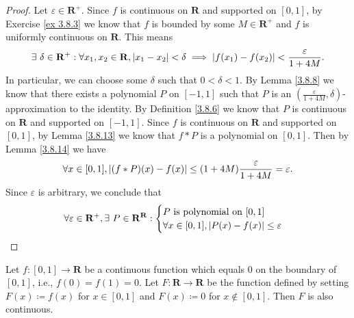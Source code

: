 \begin{proof}
    Let \(\varepsilon \in \mathbf{R}^+\).
    Since \(f\) is continuous on \(\mathbf{R}\) and supported on \([0, 1]\), by Exercise \ref{ex 3.8.3} we know that \(f\) is bounded by some \(M \in \mathbf{R}^+\) and \(f\) is uniformly continuous on \(\mathbf{R}\).
    This means
    \[
        \exists\ \delta \in \mathbf{R}^+ : \forall x_1, x_2 \in \mathbf{R}, \abs*{x_1 - x_2} < \delta \implies \abs*{f(x_1) - f(x_2)} < \frac{\varepsilon}{1 + 4M}.
    \]
    In particular, we can choose some \(\delta\) such that \(0 < \delta < 1\).
    By Lemma \ref{3.8.8} we know that there exists a polynomial \(P\) on \([-1, 1]\) such that \(P\) is an \((\frac{\varepsilon}{1 + 4M}, \delta)\)-approximation to the identity.
    By Definition \ref{3.8.6} we know that \(P\) is continuous on \(\mathbf{R}\) and supported on \([-1, 1]\).
    Since \(f\) is continuous on \(\mathbf{R}\) and supported on \([0, 1]\), by Lemma \ref{3.8.13} we know that \(f * P\) is a polynomial on \([0, 1]\).
    Then by Lemma \ref{3.8.14} we have
    \[
        \forall x \in [0, 1], \abs*{(f * P)(x) - f(x)} \leq (1 + 4M) \frac{\varepsilon}{1 + 4M} = \varepsilon.
    \]
    Since \(\varepsilon\) is arbitrary, we conclude that
    \[
        \forall \varepsilon \in \mathbf{R}^+, \exists\ P \in \mathbf{R}^{\mathbf{R}} : \begin{cases}
            P \text{ is polynomial on } [0, 1] \\
            \forall x \in [0, 1], \abs*{P(x) - f(x)} \leq \varepsilon
        \end{cases}
    \]
\end{proof}

\begin{lemma}\label{3.8.16}
    Let \(f : [0, 1] \to \mathbf{R}\) be a continuous function which equals \(0\) on the boundary of \([0, 1]\), i.e., \(f(0) = f(1) = 0\).
    Let \(F : \mathbf{R} \to \mathbf{R}\) be the function defined by setting \(F(x) \coloneqq f(x)\) for \(x \in [0, 1]\) and \(F(x) \coloneqq 0\) for \(x \notin [0, 1]\).
    Then \(F\) is also continuous.
\end{lemma}

